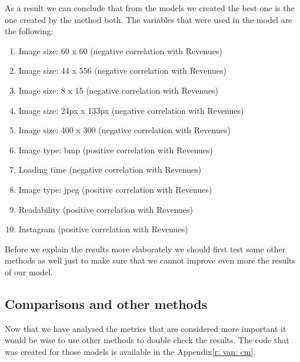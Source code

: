 \documentclass{book}
\begin{document}
As a result we can conclude that from the models we created the best one is the one created by the method both. The variables that were used in the model are the following:
\begin{enumerate}
\item Image size: 60 x 60 (negative correlation with Revenues)
\item Image size: 44 x 556 (negative correlation with Revenues)
\item Image size: 8 x 15 (negative correlation with Revenues)
\item Image size: 24px x 133px (negative correlation with Revenues)
\item Image size: 400 x 300 (negative correlation with Revenues)
\item Image type: bmp (positive correlation with Revenues)
\item Loading time (negative correlation with Revenues)
\item Image type: jpeg (positive correlation with Revenues)
\item Readability (positive correlation with Revenues)
\item Instagram (positive correlation with Revenues) 
\end{enumerate}
Before we explain the results more elaborately we should first test some other methods as well just to make sure that we cannot improve even more the results of our model.
\subsection{Comparisons and other methods}
Now that we have analysed the metrics that are considered more important it would be wise to use other methods to double check the results. The code that was created for those models is available in the Appendix\ref{r: van: cm}.
\end{document}
